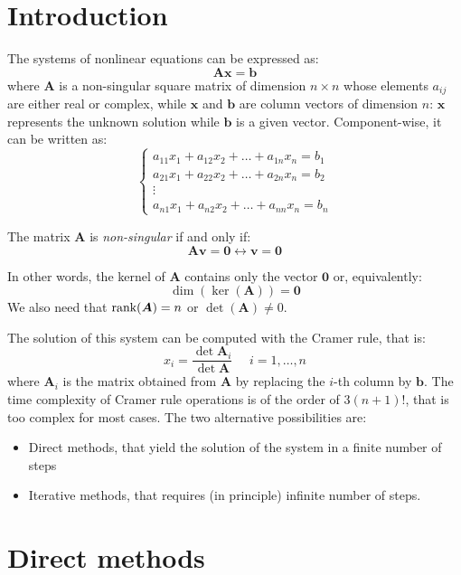 \documentclass[12pt, a4paper]{report}
\newtheorem[style=M,bodystyle=\normalfont]{theorem}{Theorem}
\newtheorem[style=M,bodystyle=\normalfont]{proposition}{Proposition}
\newtheorem[style=M,bodystyle=\normalfont]{corollary}{Corollary}
\newtheorem[style=M,bodystyle=\normalfont]{lemma}{Lemma}
\newtheorem[style=M,bodystyle=\normalfont]{definition}{Definition}
\begin{document}
    \section{Introduction}
    The systems of nonlinear equations can be expressed as: 
    \[\boldsymbol{Ax}=\boldsymbol{b}\]
    where $\boldsymbol{A}$ is a non-singular square matrix of dimension $n \times n$ whose elements $a_{ij}$ are either real or complex, while $\boldsymbol{x}$ and $\boldsymbol{b}$ are column vectors of dimension $n$: 
    $\boldsymbol{x}$ represents the unknown solution while $\boldsymbol{b}$ is a given vector. Component-wise, it can be written as: 
    \[
    \begin{cases}
        a_{11}x_1+a_{12}x_2+\dots+a_{1n}x_n=b_1 \\
        a_{21}x_1+a_{22}x_2+\dots+a_{2n}x_n=b_2 \\
        \vdots                                  \\
        a_{n1}x_1+a_{n2}x_2+\dots+a_{nn}x_n=b_n
    \end{cases}
    \]
    \begin{definition}
        The matrix $\boldsymbol{A}$ is \emph{non-singular} if and only if: 
        \[\boldsymbol{Av}=\boldsymbol{0}\leftrightarrow\boldsymbol{v}=\boldsymbol{0}\]
    \end{definition}
    In other words, the kernel of $\boldsymbol{A}$ contains only the vector $\boldsymbol{0}$ or, equivalently: 
    \[\dim{\left(\ker{\left(\boldsymbol{A}\right)}\right)}=\boldsymbol{0}\]
    We also need that $\textnormal{rank}(\boldsymbol{A})=n$ or $\det(\boldsymbol{A})\neq 0$. 

    The solution of this system can be computed with the Cramer rule, that is: 
    \[x_i=\dfrac{\det{\boldsymbol{A}_i}}{\det{\boldsymbol{A}}} \:\:\:\:\:\: i=1,\dots,n\]
    where $\boldsymbol{A}_i$ is the matrix obtained from $\boldsymbol{A}$ by replacing the $i$-th column by $\boldsymbol{b}$. The time 
    complexity of Cramer rule operations is of the order of $3(n+1)!$, that is too complex for most cases. 
    The two alternative possibilities are: 
    \begin{itemize}
        \item Direct methods, that yield the solution of the system in a finite number of steps
        \item Iterative methods, that requires (in principle) infinite number of steps. 
    \end{itemize}

    \section{Direct methods}
\end{document}
